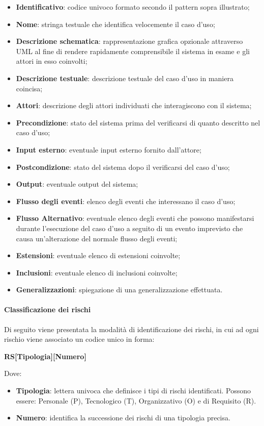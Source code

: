 \begin{itemize}
  \item \textbf{Identificativo}: codice univoco formato secondo il pattern sopra illustrato;
  \item \textbf{Nome}: stringa testuale che identifica velocemente il caso d'uso;
  \item \textbf{Descrizione schematica}: rappresentazione grafica opzionale attraverso UML al fine di rendere rapidamente comprensibile il sistema in esame e gli attori in esso coinvolti;
  \item \textbf{Descrizione testuale}: descrizione testuale del caso d'uso in maniera coincisa;
  \item \textbf{Attori}: descrizione degli attori individuati che interagiscono con il sistema;
  \item \textbf{Precondizione}: stato del sistema prima del verificarsi di quanto descritto nel caso d'uso;
  \item \textbf{Input esterno}: eventuale input esterno fornito dall'attore;
  \item \textbf{Postcondizione}: stato del sistema dopo il verificarsi del caso d'uso;
  \item \textbf{Output}: eventuale output del sistema;
  \item \textbf{Flusso degli eventi}: elenco degli eventi che interessano il caso d'uso;
  \item \textbf{Flusso Alternativo}: eventuale elenco degli eventi che possono manifestarsi durante l'esecuzione del caso d'uso a seguito di un evento imprevisto che causa un'alterazione del normale flusso degli eventi;
  \item \textbf{Estensioni}: eventuale elenco di estensioni coinvolte;
  \item \textbf{Inclusioni}: eventuale elenco di inclusioni coinvolte;
  \item \textbf{Generalizzazioni}: spiegazione di una generalizzazione effettuata.
\end{itemize}

\paragraph{Classificazione dei rischi}
Di seguito viene presentata la modalità di identificazione dei rischi, in cui ad ogni rischio viene associato un codice unico in forma:
\begin{center}
	\textbf{RS[Tipologia][Numero]}
\end{center}
Dove: 
\begin{itemize}
	\item \textbf{Tipologia}: lettera univoca che definisce i tipi di rischi identificati. 
	\newline Possono essere: Personale (P), Tecnologico (T), Organizzativo (O) e di Requisito (R).
	\item \textbf{Numero}: identifica la successione dei rischi di una tipologia precisa.
\end{itemize}


